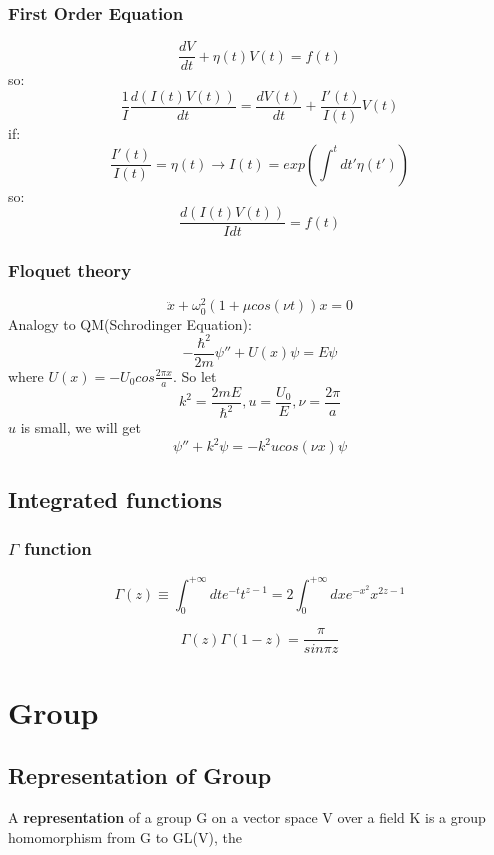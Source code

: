 \subsubsection{First Order Equation}
\[ 
\frac{dV}{dt} + \eta(t)V(t) = f(t)  
\]
so:
\[
    \frac{1}{I}\frac{d(I(t)V(t))}{dt} = \frac{dV(t)}{dt} + \frac{I'(t)}{I(t)}V(t)
    \]
if: 
\[ 
    \frac{I'(t)}{I(t)} = \eta(t)	\rightarrow I(t) = exp(\int^{t}dt'\eta(t'))
    \]
so:
\[ \frac{d(I(t)V(t))}{I dt} = f(t)\]

\subsubsection{Floquet theory}
\begin{equation}
    \ddot{x} + \omega_{0}^{2}(1+\mu cos(\nu t))x = 0
\end{equation}
Analogy to QM(Schrodinger Equation):	
\[
    -\frac{\hbar^{2}}{2m}{\psi''} + U(x)\psi = E\psi
    \]
where $U(x) = -U_{0}cos\frac{2\pi x}{a}$.
So let 
\[
    k^{2} = \frac{2mE}{\hbar^{2}}, u=\frac{U_0}{E}, \nu=\frac{2\pi}{a}
    \]
$u$ is small, we will get   
\[ 
    \psi''+k^{2}\psi = -k^{2}ucos(\nu x)\psi
    \]

\subsection{Integrated functions}
\subsubsection{$\Gamma$ function}
\[\Gamma(z) \equiv \int_{0}^{+\infty}dt e^{-t} t^{z-1} =
2\int_{0}^{+\infty}dx e^{-x^2}x^{2z-1}\]

\[\Gamma(z)\Gamma(1-z) = \frac{\pi}{sin\pi z}\]

\section{Group}

\subsection{Representation of Group}
A \textbf{representation} of a group G on a vector space V over a field K is
a group homomorphism from G to GL(V), the 
